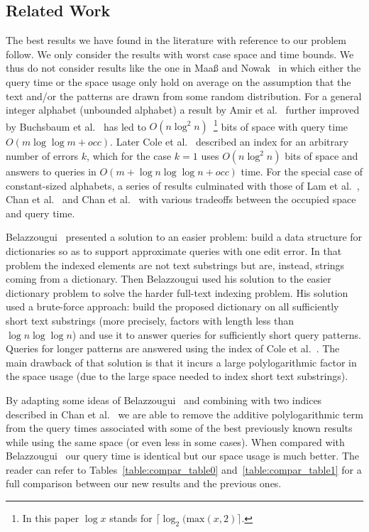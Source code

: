 \documentclass{article}
\newcommand{\?}{\mskip1.5mu}
\begin{document}
\subsection{Related Work}
The best results we have found in the literature with reference to our problem follow. We only consider the results with worst case space and time bounds. We thus do not consider results like the one in Maa{\ss} and Nowak~\cite{MN05} in which either the query time or the space usage only hold on average on the assumption that the text and/or the patterns are drawn from some random distribution. 
For a general integer alphabet (unbounded alphabet) a result by Amir et al.~\cite{AKLLLR00} further improved by Buchsbaum et al.~\cite{BGW00} has led to $O(n\log^2 n)$~\footnote{In this paper $\log x$ stands for $\lceil\log_2 (\mbox{max}(x,2)\rceil$.} bits of space with query time $O(m\log\log m+occ)$. Later Cole et al.~\cite{CGL04} described an index for an arbitrary number of errors $k$, which for the case $k=1$ uses $O(n\log^2 n)$ bits of space and answers to queries in $O(m+\log n\log\log n+occ)$ time. For the special case of constant-sized alphabets, a series of results culminated with those of Lam et al.~\cite{LSW08}, Chan et al.~\cite{chan2011linear} and Chan et al.~\cite{CLSTW10} with various tradeoffs between the occupied space and query time. 

Belazzougui~\cite{B09} presented a solution to an easier problem: build a data structure for dictionaries so as to support approximate queries with one edit error. In that problem the indexed elements are not text substrings but are, instead, strings coming from a dictionary. Then Belazzougui used his solution to the easier dictionary problem to solve the harder full-text indexing problem. His solution used a brute-force approach: build the proposed dictionary on all sufficiently short text substrings (more precisely, factors with length less than $\log n\log\log n$) and use it to answer queries for sufficiently short query patterns. Queries for longer patterns are answered using the index of Cole et al.~\cite{CGL04}. The main drawback of that solution is that it incurs a large polylogarithmic factor in the space usage (due to the large space needed to index short text substrings). 

By adapting some ideas of Belazzougui~\cite{B09} and combining with two indices described in Chan et al.~\cite{chan2011linear} we are able to remove the additive polylogarithmic term from the query times associated with some of the best previously known results while using the same space (or even less in some cases). When compared with Belazzougui~\cite{B09} our query time is identical but our space usage is much better. 
The reader can refer to Tables~\ref{table:compar_table0} and~\ref{table:compar_table1} for a full comparison between our new results and the previous ones. 
\end{document}
